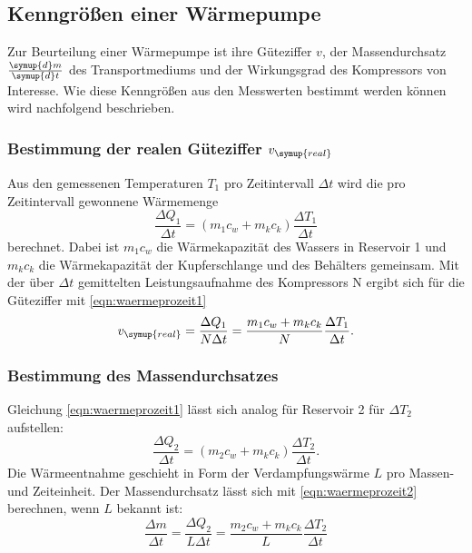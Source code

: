   \subsection{Kenngrößen einer Wärmepumpe}
  Zur Beurteilung einer Wärmepumpe ist ihre Güteziffer $v$, der Massendurchsatz
  $\frac{\symup{d}m}{\symup{d}t}$ des Transportmediums und der Wirkungsgrad des
  Kompressors von Interesse. Wie diese Kenngrößen aus den Messwerten bestimmt werden
  können wird nachfolgend beschrieben.
  \subsubsection{Bestimmung der realen Güteziffer $v_\symup{real}$}
  Aus den gemessenen Temperaturen $T_1$ pro Zeitintervall $\Delta t$ wird die pro
  Zeitintervall gewonnene Wärmemenge
  \begin{equation}
    \frac{\Delta Q_1}{\Delta t} = (m_1 c_w + m_k c_k) \frac{\Delta T_1}{\Delta t}
    \label{eqn:waermeprozeit1}
  \end{equation}
  berechnet. Dabei ist $m_1 c_w$ die Wärmekapazität des Wassers in Reservoir 1
  und $m_k c_k$ die Wärmekapazität der Kupferschlange und des Behälters gemeinsam.
  Mit der über $\Delta t$ gemittelten Leistungsaufnahme des Kompressors N ergibt
  sich für die Güteziffer mit \eqref{eqn:waermeprozeit1}
  \begin{equation}
    v_\symup{real} = \frac{\Delta Q_1}{N\Delta t} = \frac{m_1 c_w + m_k c_k}{N} \frac{\Delta T_1}{\Delta t}.
    \label{eqn:berechnung_gueteziffer}
  \end{equation}


  \subsubsection{Bestimmung des Massendurchsatzes}
  Gleichung \eqref{eqn:waermeprozeit1} lässt sich analog für Reservoir 2 für
  $\Delta T_2$ aufstellen:
  \begin{equation}
    \frac{\Delta Q_2}{\Delta t} = (m_2 c_w + m_k c_k) \frac{\Delta T_2}{\Delta t}.
    \label{eqn:waermeprozeit2}
  \end{equation}
  Die Wärmeentnahme geschieht in Form der Verdampfungswärme $L$ pro Massen- und
  Zeiteinheit. Der Massendurchsatz lässt sich mit \eqref{eqn:waermeprozeit2} berechnen,
  wenn $L$ bekannt ist:
  \begin{equation}
    \frac{\Delta m}{\Delta t} = \frac{\Delta Q_2}{L\Delta t}
    = \frac{m_2 c_w + m_k c_k}{L} \frac{\Delta T_2}{\Delta t}
    \label{eqn:massendurchsatz}
  \end{equation}


